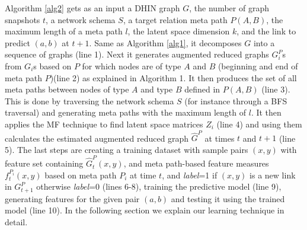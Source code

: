 Algorithm \ref{alg2} gets as an input a DHIN graph $G$, the number of graph snapshots $t$, a network schema $S$, a target relation meta path $P(A,B)$, the maximum length of a meta path $l$, the latent space dimension $k$, and the link to predict $(a,b)$ at $t+1$. Same as Algorithm \ref{alg1}, it decomposes $G$ into a sequence of graphs (line 1). Next it generates augmented reduced graphs $G^P_i$s from $G_i$s based on $P$ for which nodes are of type $A$ and $B$ (beginning and end of meta path $P$)(line 2) as explained in Algorithm 1. It then produces the set of all meta paths between nodes of type $A$ and type $B$ defined in $P(A,B)$ (line 3). This is done by traversing the network schema $S$ (for instance through a BFS traversal) and generating meta paths with the maximum length of $l$. It then applies the MF technique \cite{Zhu2016} to find latent space matrices $Z_i$ (line 4) and using them calculates the estimated augmented reduced graph $\hat{G}^{P}$ at times $t$ and $t+1$ (line 5). The last steps are creating a training dataset with sample pairs $(x,y)$ with feature set containing $\hat{G}^{P}_{t}(x,y)$, and meta path-based feature measures $f^{P_i}_t(x,y)$ based on meta path $P_i$ at time $t$, and \textit{label}=1 if $(x,y)$ is a new link in $G^{P}_{t+1}$ otherwise \textit{label}=0 (lines 6-8), training the predictive model (line 9), generating features for the given pair $(a,b)$ and testing it using the trained model (line 10). In the following section we explain our learning technique in detail.







